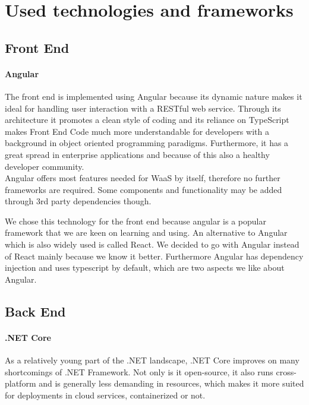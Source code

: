 \documentclass[titlepage, 12pt]{article}
\begin{document}
\pagebreak

\section{Used technologies and frameworks}

\subsection{Front End}

\paragraph{Angular}
The front end is implemented using Angular because its dynamic nature makes it ideal for handling user interaction with a RESTful web service.
Through its architecture it promotes a clean style of coding and its reliance on TypeScript makes Front End Code much more understandable for developers with a background in object oriented programming paradigms.
Furthermore, it has a great spread in enterprise applications and because of this also a healthy developer community. \\
Angular offers most features needed for WaaS by itself, therefore no further frameworks are required. Some components and functionality may be added through 3rd party dependencies though.

We chose this technology for the front end because angular is a popular framework that we are keen on learning and using. An alternative to Angular which is also widely used is called React. We decided to go with Angular instead of React mainly because we know it better. Furthermore Angular has dependency injection and uses typescript by default, which are two aspects we like about Angular.

\subsection{Back End}

\paragraph{.NET Core}
As a relatively young part of the .NET landscape, .NET Core improves on many shortcomings of .NET Framework. Not only is it open-source, it also runs cross-platform and is generally less demanding in resources, which makes it more suited for deployments in cloud services, containerized or not.
\end{document}
